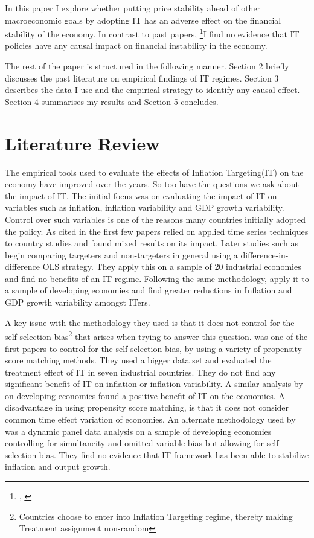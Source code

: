 \documentclass[12pt]{article}
\begin{document}
In this paper I explore whether putting price stability ahead of other macroeconomic goals by adopting IT has an adverse effect on the financial stability of the economy.  In contrast to past papers, \footnote{\cite{RN4}, \cite{RN34}}I find no evidence that IT policies have any causal impact on financial instability in the economy.

The rest of the paper is structured in the following manner. Section 2 briefly discusses the past literature on empirical findings of IT regimes.  Section 3 describes the data I use and the empirical strategy to identify any causal effect. Section 4 summarises my results and Section 5 concludes.

\section{Literature Review}

The empirical tools used to evaluate the effects of Inflation Targeting(IT) on the economy have improved over the years. So too have the questions we ask about the impact of IT. The initial focus was on evaluating the impact of IT on variables such as inflation, inflation variability and GDP growth variability.  Control over such variables is one of the reasons many countries initially adopted the policy. As cited in \cite{RN13} the first few papers relied on applied time series techniques to country studies and found mixed results on its impact. Later studies such as \cite{RN10} begin comparing targeters and non-targeters in general using a difference-in-difference OLS strategy.  They apply this on a sample of 20 industrial economies and find no benefits of an IT regime. Following the same methodology, \cite{RN33} apply it to a sample of developing economies and find greater reductions in Inflation and GDP growth variability amongst ITers.

A key issue with the methodology they used is that it does not control for the self selection bias\footnote{Countries choose to enter into Inflation Targeting regime, thereby making Treatment assignment non-random} that arises when trying to answer this question.
\cite{RN13} was one of the first papers to control for the self selection bias, by using a variety of propensity score matching methods. They used a bigger data set and evaluated the treatment effect of IT in seven industrial countries. They do not find any significant benefit of IT on inflation or inflation variability. A similar analysis by \cite{RN14} on developing economies found a positive benefit of IT on the economies.
A disadvantage in using propensity score matching, is that it does not consider common time effect variation of economies. An alternate methodology used by \cite{RN16}  was a dynamic panel data analysis on a sample of developing economies controlling for simultaneity and omitted variable bias but allowing for self-selection bias. They find no evidence that IT framework has been able to stabilize inflation and output growth.
\end{document}
